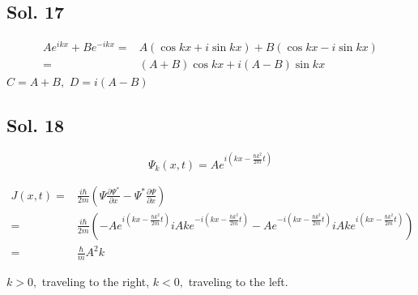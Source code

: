 \subsection*{Sol. 17}
\begin{align*}
    Ae^{ikx}+Be^{-ikx} =& 
A(\cos kx+i\sin kx) + B(\cos kx-i\sin kx)\\
=&(A+B)\cos kx + i(A-B)\sin kx
\end{align*}
$C=A+B,$ $D=i(A-B)$

\subsection*{Sol. 18}

$$
\Psi_k(x,t)=Ae^{i(kx-\frac{\hbar k^2}{2m}t)}
$$

\begin{align*}
    J(x,t)= & \frac{i\hbar}{2m}(\Psi\frac{\partial\Psi^*}{\partial x} 
    - \Psi^*\frac{\partial\Psi}{\partial x})\\
    = & \frac{i\hbar}{2m}(
    -Ae^{i(kx-\frac{\hbar k^2}{2m}t)}
    iAke^{-i(kx-\frac{\hbar k^2}{2m}t)}
    -Ae^{-i(kx-\frac{\hbar k^2}{2m}t)}
    iAke^{i(kx-\frac{\hbar k^2}{2m}t)}
    )\\
    =&\frac{\hbar}{m}A^2k
\end{align*}

$k>0,$ traveling to the right, $k<0,$ traveling to the left.

